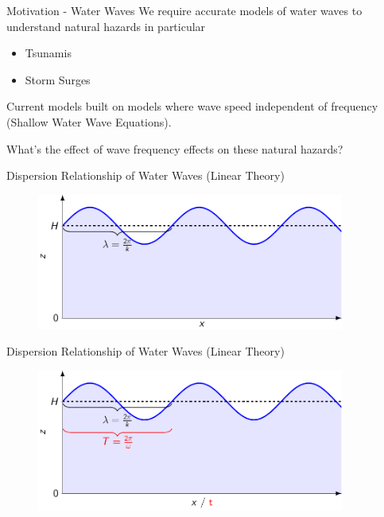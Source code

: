 \documentclass[pdf]{beamer}
\begin{document}
\begin{frame}{Motivation - Water Waves}
We require accurate models of water waves to understand natural hazards in particular
\begin{itemize}
	\item Tsunamis
	\item Storm Surges
\end{itemize}
\bigskip
Current models built on models where wave speed independent of frequency (Shallow Water Wave Equations). 
\pause

\bigskip
What's the effect of wave frequency effects on these natural hazards?
\end{frame}

\begin{frame}{Dispersion Relationship of Water Waves (Linear Theory)}
\begin{figure}
	\centering
	\includegraphics[width=0.9\textwidth]{./Pics/Tex/Explanatory/DispersionPlot/Dispersion.pdf}
\end{figure}
\end{frame}

\begin{frame}{Dispersion Relationship of Water Waves (Linear Theory)}
\begin{figure}
	\centering
	\includegraphics[width=0.9\textwidth]{./Pics/Tex/Explanatory/DispersionPlot/Dispersion_Analagous.pdf}
\end{figure}
\end{frame}
\end{document}
